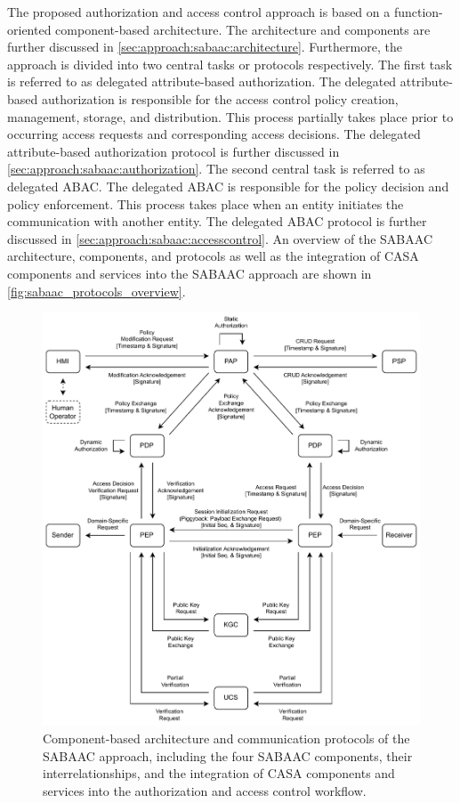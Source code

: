 The proposed authorization and access control approach is based on a function-oriented component-based architecture.
The architecture and components are further discussed in \autoref{sec:approach:sabaac:architecture}.
Furthermore, the approach is divided into two central tasks or protocols respectively.
The first task is referred to as delegated attribute-based authorization.
The delegated attribute-based authorization is responsible for the access control policy creation, management, storage, and distribution.
This process partially takes place prior to occurring access requests and corresponding access decisions.
The delegated attribute-based authorization protocol is further discussed in \autoref{sec:approach:sabaac:authorization}.
The second central task is referred to as delegated ABAC.
The delegated ABAC is responsible for the policy decision and policy enforcement.
This process takes place when an entity initiates the communication with another entity.
The delegated ABAC protocol is further discussed in \autoref{sec:approach:sabaac:accesscontrol}.
An overview of the SABAAC architecture, components, and protocols as well as the integration of CASA components and services into the SABAAC approach are shown in \autoref{fig:sabaac_protocols_overview}.
\begin{figure}
	\centering
    \includegraphics[width=1.0\linewidth]{figures/SABAAC_protocols_overview.drawio.pdf}
	\caption{Component-based architecture and communication protocols of the SABAAC approach, including the four SABAAC components, their interrelationships, and the integration of CASA components and services into the authorization and access control workflow.}
	\label{fig:sabaac_protocols_overview}
\end{figure}

